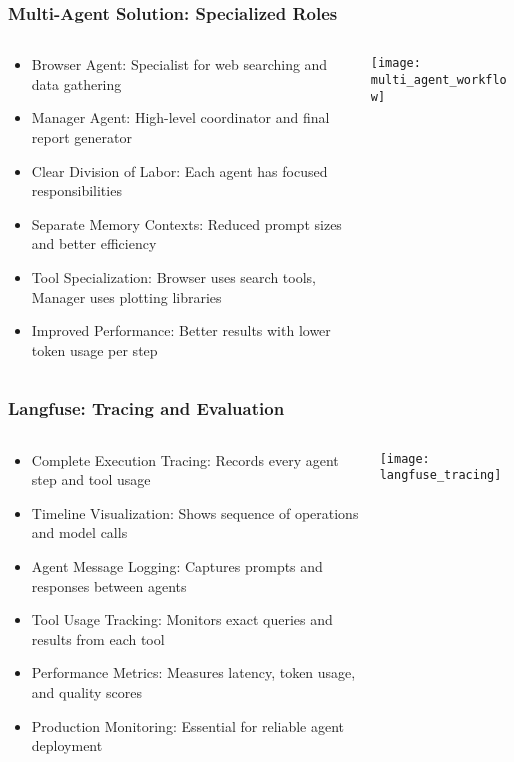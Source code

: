 \begin{frame}[fragile]\frametitle{Multi-Agent Solution: Specialized Roles}
\begin{columns}
    \begin{column}[T]{0.6\linewidth}
      \begin{itemize}
		\item Browser Agent: Specialist for web searching and data gathering
		\item Manager Agent: High-level coordinator and final report generator
		\item Clear Division of Labor: Each agent has focused responsibilities
		\item Separate Memory Contexts: Reduced prompt sizes and better efficiency
		\item Tool Specialization: Browser uses search tools, Manager uses plotting libraries
		\item Improved Performance: Better results with lower token usage per step
	  \end{itemize}
    \end{column}
    \begin{column}[T]{0.4\linewidth}
		\begin{center}
		\texttt{[image: multi\_agent\_workflow]}
		\end{center}	
    \end{column}
  \end{columns}
\end{frame}

\begin{frame}[fragile]\frametitle{Langfuse: Tracing and Evaluation}
\begin{columns}
    \begin{column}[T]{0.6\linewidth}
      \begin{itemize}
		\item Complete Execution Tracing: Records every agent step and tool usage
		\item Timeline Visualization: Shows sequence of operations and model calls
		\item Agent Message Logging: Captures prompts and responses between agents
		\item Tool Usage Tracking: Monitors exact queries and results from each tool
		\item Performance Metrics: Measures latency, token usage, and quality scores
		\item Production Monitoring: Essential for reliable agent deployment
	  \end{itemize}
    \end{column}
    \begin{column}[T]{0.4\linewidth}
		\begin{center}
		\texttt{[image: langfuse\_tracing]}
		\end{center}	
    \end{column}
  \end{columns}
\end{frame}

